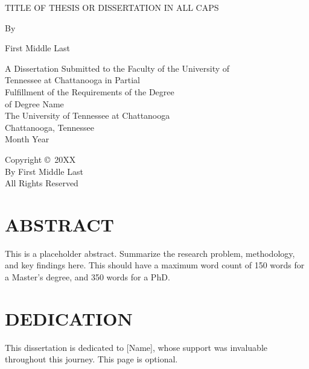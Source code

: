 \documentclass[12pt]{report} %
\newcommand{\ManuscriptTitle}{TITLE OF THESIS OR DISSERTATION IN ALL CAPS}
\newcommand{\AuthorFullName}{First Middle Last} %
\newcommand{\DegreeName}{Degree Name} %
\newcommand{\GradMonthYear}{Month Year} %
\newcommand{\CopyrightYear}{20XX}
\newcommand{\UTCTitlePageOuterGap}{1.5in}
\newcommand{\UTCTitlePageDegreeGap}{0.5in}
\newcommand{\UTCTitlePageDateGap}{0.25in}
\begin{document}
\thispagestyle{plain}
\begin{center}
\ManuscriptTitle\par
\vspace{\UTCTitlePageOuterGap}
By\par
\AuthorFullName\par
\vspace{\UTCTitlePageOuterGap}
\begin{singlespace}
A Dissertation Submitted to the Faculty of the University of\\
Tennessee at Chattanooga in Partial\\
Fulfillment of the Requirements of the Degree\\
of \DegreeName\\[\UTCTitlePageDegreeGap]
The University of Tennessee at Chattanooga\\
Chattanooga, Tennessee\\[\UTCTitlePageDateGap]
\GradMonthYear
\end{singlespace}
\end{center}
\restoregeometry
\clearpage

\vspace*{\fill}
\begin{center}
    Copyright \copyright\ \CopyrightYear \\
    By \AuthorFullName \\
    All Rights Reserved
\end{center}
\vspace*{\fill}
\clearpage

\chapter*{ABSTRACT}
This is a placeholder abstract. Summarize the research problem, methodology, and key findings here. This should have a maximum word count of 150 words for a Master's degree, and 350 words for a PhD.

\chapter*{DEDICATION} %
This dissertation is dedicated to [Name], whose support was invaluable throughout this journey. This page is optional.
\end{document}
